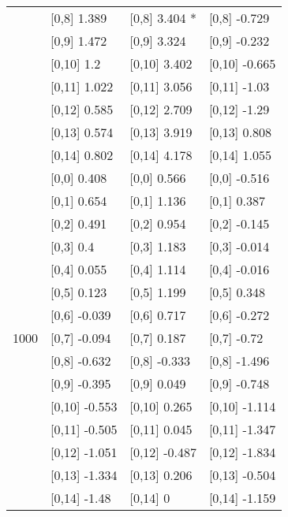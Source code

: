 \begin{table}
\begin{tabular}[t]{llll}
 & {}[0,8] 1.389 & {}[0,8] 3.404 * & {}[0,8] -0.729\\
 & {}[0,9] 1.472 & {}[0,9] 3.324 & {}[0,9] -0.232\\
\addlinespace
 & {}[0,10] 1.2 & {}[0,10] 3.402 & {}[0,10] -0.665\\
 & {}[0,11] 1.022 & {}[0,11] 3.056 & {}[0,11] -1.03\\
 & {}[0,12] 0.585 & {}[0,12] 2.709 & {}[0,12] -1.29\\
 & {}[0,13] 0.574 & {}[0,13] 3.919 & {}[0,13] 0.808\\
 & {}[0,14] 0.802 & {}[0,14] 4.178 & {}[0,14] 1.055\\
\addlinespace
 & {}[0,0] 0.408 & {}[0,0] 0.566 & {}[0,0] -0.516\\
 & {}[0,1] 0.654 & {}[0,1] 1.136 & {}[0,1] 0.387\\
 & {}[0,2] 0.491 & {}[0,2] 0.954 & {}[0,2] -0.145\\
 & {}[0,3] 0.4 & {}[0,3] 1.183 & {}[0,3] -0.014\\
 & {}[0,4] 0.055 & {}[0,4] 1.114 & {}[0,4] -0.016\\
\addlinespace
 & {}[0,5] 0.123 & {}[0,5] 1.199 & {}[0,5] 0.348\\
 & {}[0,6] -0.039 & {}[0,6] 0.717 & {}[0,6] -0.272\\
1000 & {}[0,7] -0.094 & {}[0,7] 0.187 & {}[0,7] -0.72\\
 & {}[0,8] -0.632 & {}[0,8] -0.333 & {}[0,8] -1.496\\
 & {}[0,9] -0.395 & {}[0,9] 0.049 & {}[0,9] -0.748\\
\addlinespace
 & {}[0,10] -0.553 & {}[0,10] 0.265 & {}[0,10] -1.114\\
 & {}[0,11] -0.505 & {}[0,11] 0.045 & {}[0,11] -1.347\\
 & {}[0,12] -1.051 & {}[0,12] -0.487 & {}[0,12] -1.834\\
 & {}[0,13] -1.334 & {}[0,13] 0.206 & {}[0,13] -0.504\\
 & {}[0,14] -1.48 & {}[0,14] 0 & {}[0,14] -1.159\\
\bottomrule
\end{tabular}
\end{table}
